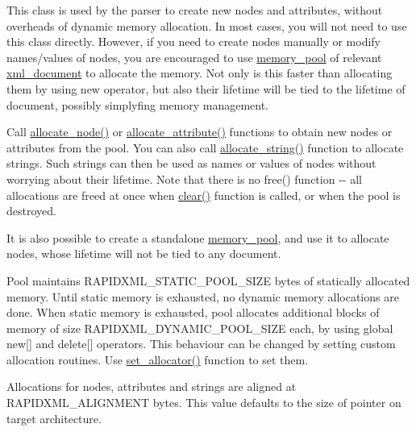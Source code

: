 This class is used by the parser to create new nodes and attributes, without overheads of dynamic memory allocation. In most cases, you will not need to use this class directly. However, if you need to create nodes manually or modify names/values of nodes, you are encouraged to use \hyperlink{classrapidxml_1_1memory__pool}{memory\_\-pool} of relevant \hyperlink{classrapidxml_1_1xml__document}{xml\_\-document} to allocate the memory. Not only is this faster than allocating them by using {\ttfamily new} operator, but also their lifetime will be tied to the lifetime of document, possibly simplyfing memory management. \par
\par
 Call \hyperlink{classrapidxml_1_1memory__pool_a4118581c29ee9a2f6b55ebf7dac185f8}{allocate\_\-node()} or \hyperlink{classrapidxml_1_1memory__pool_a3de2a66c983336e006ea3844e244ed30}{allocate\_\-attribute()} functions to obtain new nodes or attributes from the pool. You can also call \hyperlink{classrapidxml_1_1memory__pool_a171941b39d55b868358da97462185f58}{allocate\_\-string()} function to allocate strings. Such strings can then be used as names or values of nodes without worrying about their lifetime. Note that there is no {\ttfamily free()} function -\/-\/ all allocations are freed at once when \hyperlink{classrapidxml_1_1memory__pool_aad377c835fdaed1cb2cc9df194cf84e4}{clear()} function is called, or when the pool is destroyed. \par
\par
 It is also possible to create a standalone \hyperlink{classrapidxml_1_1memory__pool}{memory\_\-pool}, and use it to allocate nodes, whose lifetime will not be tied to any document. \par
\par
 Pool maintains {\ttfamily RAPIDXML\_\-STATIC\_\-POOL\_\-SIZE} bytes of statically allocated memory. Until static memory is exhausted, no dynamic memory allocations are done. When static memory is exhausted, pool allocates additional blocks of memory of size {\ttfamily RAPIDXML\_\-DYNAMIC\_\-POOL\_\-SIZE} each, by using global {\ttfamily new\mbox{[}\mbox{]}} and {\ttfamily delete\mbox{[}\mbox{]}} operators. This behaviour can be changed by setting custom allocation routines. Use \hyperlink{classrapidxml_1_1memory__pool_a84d3d8d2cdfc00501e1dcf26d889ae03}{set\_\-allocator()} function to set them. \par
\par
 Allocations for nodes, attributes and strings are aligned at {\ttfamily RAPIDXML\_\-ALIGNMENT} bytes. This value defaults to the size of pointer on target architecture. \par
